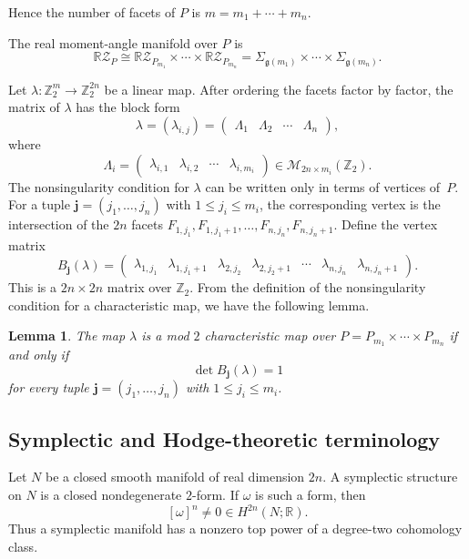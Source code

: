 \documentclass{amsart}
\newtheorem{lemma}[theorem]{Lemma}
\numberwithin{equation}{section}
\theoremstyle{definition}
\theoremstyle{remark}
\newcommand{\Z}{\mathbb Z}
\newcommand{\R}{\mathbb R}
\newcommand{\cM}{\mathcal M}
\newcommand{\RZ}{\mathbb R\mathcal Z}
\newcommand{\bj}{\mathbf j}
\newcommand{\genus}{\mathfrak g}
\begin{document}
Hence the number of facets of $P$ is $m=m_1+\cdots+m_n$.

The real moment-angle manifold over $P$ is 
\begin{equation}\label{eq:RZK_productpolygon}
    \RZ_P \cong \RZ_{P_{m_1}}\times\cdots\times \RZ_{P_{m_n}} = \Sigma_{\genus(m_1)} \times \cdots \times \Sigma_{\genus(m_n)}.
\end{equation}

Let $\lambda\colon \Z_2^m \to \Z_2^{2n}$ be a linear map.
After ordering the facets factor by factor, the matrix of $\lambda$ has the
block form
$$
    \lambda= (\lambda_{i,j}) = \begin{pmatrix} \Lambda_1 & \Lambda_2 & \cdots & \Lambda_n \end{pmatrix},
$$
where
$$
    \Lambda_i= \begin{pmatrix} \lambda_{i,1} & \lambda_{i,2} & \cdots & \lambda_{i,m_i}\end{pmatrix} \in \cM_{2n\times m_i}(\Z_2).
$$
The nonsingularity condition for $\lambda$ can be written only in terms of vertices of~$P$.
For a tuple $\bj=(j_1,\ldots,j_n)$ with $1\leq j_i\leq m_i$, the corresponding vertex is the intersection of the $2n$ facets $F_{1,j_1},F_{1,j_1+1},    \ldots, F_{n,j_n},F_{n,j_n+1}$.
Define the vertex matrix
$$
    B_{\mathbf j}(\lambda) =
        \begin{pmatrix}
            \lambda_{1,j_1} & \lambda_{1,j_1+1} & \lambda_{2,j_2} & \lambda_{2,j_2+1} & \cdots & \lambda_{n,j_n} & \lambda_{n,j_n+1}
        \end{pmatrix}.
$$
This is a $2n\times 2n$ matrix over $\Z_2$.
From the definition of the nonsingularity condition for a characteristic map, we have the following lemma.
\begin{lemma}\label{lem:nonsingularity-product-polygons}
    The map $\lambda$ is a mod $2$ characteristic map over
    $P=P_{m_1}\times\cdots\times P_{m_n}$ if and only if
    $$
        \det B_{\mathbf j}(\lambda)=1
    $$
    for every tuple $\bj =(j_1,\ldots,j_n)$ with $1\leq j_i\leq m_i$.
\end{lemma}


\subsection{Symplectic and Hodge-theoretic terminology}

Let $N$ be a closed smooth manifold of real dimension $2n$.
A symplectic structure on $N$ is a closed nondegenerate $2$-form.
If $\omega$ is such a form, then
$$
    [\omega]^n\neq 0 \in H^{2n}(N;\R).
$$
Thus a symplectic manifold has a nonzero top power of a degree-two cohomology class.
\end{document}
